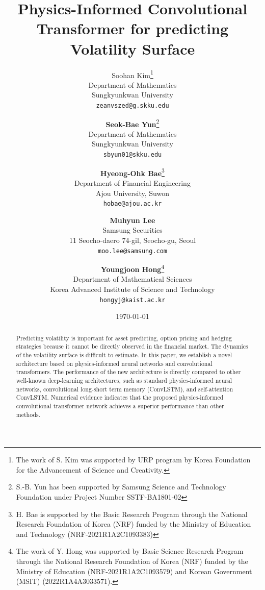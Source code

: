 \documentclass{article}
\title{Physics-Informed Convolutional Transformer for predicting Volatility Surface}
\date{\today}	%
\author{
    Soohan Kim\thanks{The work of S. Kim was supported by URP program by Korea Foundation for the Advancement of Science and Creativity.}\\
	Department of Mathematics\\
	Sungkyunkwan University\\
	\texttt{zeanvszed@g.skku.edu} 
	 \and
	 {\bf Seok-Bae Yun}\thanks{S.-B. Yun has been supported by Samsung Science and Technology Foundation under Project Number SSTF-BA1801-02} \\
	Department of Mathematics\\
	Sungkyunkwan University\\
	\texttt{sbyun01@skku.edu} 
	 \and
 	 {\bf Hyeong-Ohk Bae}\thanks{H. Bae is supported by the Basic Research Program through the National Research     Foundation of Korea (NRF) funded by the Ministry of Education and Technology     (NRF-2021R1A2C1093383)} \\
        Department of Financial Engineering\\
        Ajou University, Suwon\\
	\texttt{hobae@ajou.ac.kr} 
	 \and
	 {\bf Muhyun Lee}\\
	Samsung Securities\\
	11 Seocho-daero 74-gil, Seocho-gu, Seoul\\
	\texttt{moo.lee@samsung.com} 
		 \and
    {\bf Youngjoon Hong}\thanks{The work of Y. Hong was supported by Basic Science Research Program through the National Research Foundation of Korea (NRF) funded by the Ministry of Education (NRF-2021R1A2C1093579) and Korean Government (MSIT) (2022R1A4A3033571).} \\
	Department of Mathematical Sciences\\
	Korea Advanced Institute of Science and Technology\\
	\texttt{hongyj@kaist.ac.kr} 
	 }
\begin{document}
\maketitle

\begin{abstract}
Predicting volatility is important for asset predicting, option pricing and hedging strategies because it cannot be directly observed in the financial market.
The dynamics of the volatility surface is difficult to estimate.
In this paper, we establish a novel architecture based on physics-informed neural networks and convolutional transformers.
The performance of the new architecture is directly compared to other well-known deep-learning architectures, such as standard physics-informed neural networks, convolutional long-short term memory (ConvLSTM), and self-attention ConvLSTM.
Numerical evidence indicates that the proposed physics-informed convolutional transformer network achieves a superior performance than other methods. 
\end{abstract}



 
\end{document}
